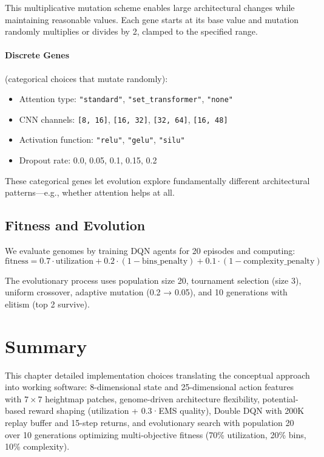 This multiplicative mutation scheme enables large architectural changes while maintaining reasonable values. Each gene starts at its base value and mutation randomly multiplies or divides by 2, clamped to the specified range.

\paragraph{Discrete Genes} (categorical choices that mutate randomly):
\begin{itemize}
    \item Attention type: \texttt{"standard"}, \texttt{"set\_transformer"}, \texttt{"none"}
    \item CNN channels: \texttt{[8, 16]}, \texttt{[16, 32]}, \texttt{[32, 64]}, \texttt{[16, 48]}
    \item Activation function: \texttt{"relu"}, \texttt{"gelu"}, \texttt{"silu"}
    \item Dropout rate: 0.0, 0.05, 0.1, 0.15, 0.2
\end{itemize}

These categorical genes let evolution explore fundamentally different architectural patterns---e.g., whether attention helps at all.

\subsection{Fitness and Evolution}

We evaluate genomes by training DQN agents for 20 episodes and computing:
\begin{equation}
\text{fitness} = 0.7 \cdot \text{utilization} + 0.2 \cdot (1 - \text{bins\_penalty}) + 0.1 \cdot (1 - \text{complexity\_penalty})
\end{equation}

The evolutionary process uses population size 20, tournament selection (size 3), uniform crossover, adaptive mutation (0.2 → 0.05), and 10 generations with elitism (top 2 survive).

\section{Summary}

This chapter detailed implementation choices translating the conceptual approach into working software: 8-dimensional state and 25-dimensional action features with $7 \times 7$ heightmap patches, genome-driven architecture flexibility, potential-based reward shaping (utilization + 0.3·EMS quality), Double DQN with 200K replay buffer and 15-step returns, and evolutionary search with population 20 over 10 generations optimizing multi-objective fitness (70\% utilization, 20\% bins, 10\% complexity).
